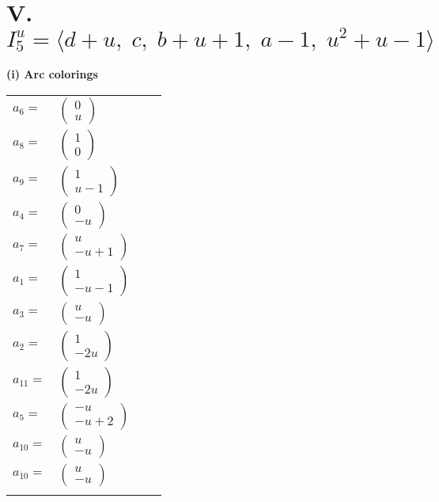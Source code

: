 \documentclass[1p]{elsarticle_modified}
\theoremstyle{definition}
\begin{document}
\centering \section*{V. $I^u_{5}= \langle d+u,\;c,\;b+u+1,\;a-1,\;u^2+u-1 \rangle$}
\flushleft \textbf{(i) Arc colorings}\\
\begin{tabular}{m{7pt} m{180pt} m{7pt} m{180pt} }
\flushright $a_{6}=$&$\begin{pmatrix}0\\u\end{pmatrix}$ \\
\flushright $a_{8}=$&$\begin{pmatrix}1\\0\end{pmatrix}$ \\
\flushright $a_{9}=$&$\begin{pmatrix}1\\u-1\end{pmatrix}$ \\
\flushright $a_{4}=$&$\begin{pmatrix}0\\- u\end{pmatrix}$ \\
\flushright $a_{7}=$&$\begin{pmatrix}u\\- u+1\end{pmatrix}$ \\
\flushright $a_{1}=$&$\begin{pmatrix}1\\- u-1\end{pmatrix}$ \\
\flushright $a_{3}=$&$\begin{pmatrix}u\\- u\end{pmatrix}$ \\
\flushright $a_{2}=$&$\begin{pmatrix}1\\-2 u\end{pmatrix}$ \\
\flushright $a_{11}=$&$\begin{pmatrix}1\\-2 u\end{pmatrix}$ \\
\flushright $a_{5}=$&$\begin{pmatrix}- u\\- u+2\end{pmatrix}$ \\
\flushright $a_{10}=$&$\begin{pmatrix}u\\- u\end{pmatrix}$\\ \flushright $a_{10}=$&$\begin{pmatrix}u\\- u\end{pmatrix}$\\&\end{tabular}
\end{document}
